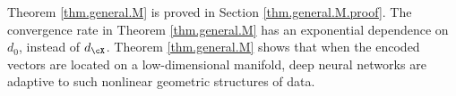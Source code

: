 \documentclass[11pt]{article} %
\begin{document}
\begin{theorem}
	
\end{theorem}
Theorem \ref{thm.general.M} is proved in Section \ref{thm.general.M.proof}. The convergence rate in Theorem \ref{thm.general.M} has an exponential dependence on $d_0$, instead of $d_{\cX}$. Theorem \ref{thm.general.M} shows that when the encoded vectors are located on a low-dimensional manifold, deep neural networks are adaptive to such nonlinear geometric structures of data. %

\end{document}
